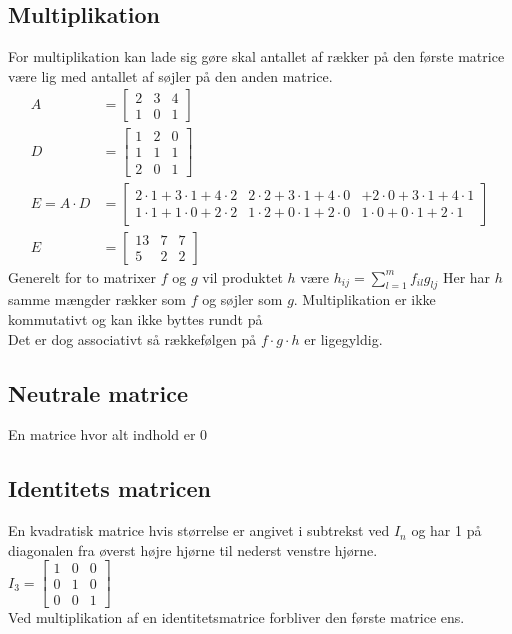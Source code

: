 \documentclass[12pt, a4paper]{article}
\begin{document}
		\subsection{Multiplikation}
			For multiplikation kan lade sig gøre skal antallet af rækker på den første matrice være lig med antallet af søjler på den anden matrice.
			\begin{align*}
				A&=\begin{bmatrix}2&3&4\\1&0&1\end{bmatrix}
				\\
				D&=\begin{bmatrix}1&2&0\\1&1&1\\2&0&1\end{bmatrix}
				\\
				E=A\cdot D &= \begin{bmatrix}2\cdot 1+3\cdot 1+4\cdot 2&2\cdot 2+3\cdot 1+4\cdot 0&+2\cdot 0+3\cdot 1+4\cdot 1\\1\cdot 1+1\cdot 0+2\cdot 2&1\cdot 2+0\cdot 1+2\cdot 0&1\cdot 0+0\cdot 1+2\cdot 1\end{bmatrix}\\
				E&=\begin{bmatrix}13&7&7\\5&2&2\end{bmatrix}
			\end{align*}
			Generelt for to matrixer $f$ og $g$ vil produktet $h$ være $h_{ij}=\sum\limits_{l=1}^mf_{il}g_{lj}$
			Her har $h$ samme mængder rækker som $f$ og søjler som $g$. 
			Multiplikation er ikke kommutativt og kan ikke byttes rundt på\\
			Det er dog associativt så rækkefølgen på $f\cdot g\cdot h$ er ligegyldig.
		\subsection{Neutrale matrice}
			En matrice hvor alt indhold er 0
		\subsection{Identitets matricen}
			En kvadratisk matrice hvis størrelse er angivet i subtrekst ved $I_n$ og har 1 på diagonalen fra øverst højre hjørne til nederst venstre hjørne.\\
			$I_3=\begin{bmatrix}1&0&0\\0&1&0\\0&0&1\end{bmatrix}$\\
			Ved multiplikation af en identitetsmatrice forbliver den første matrice ens.
\end{document}
